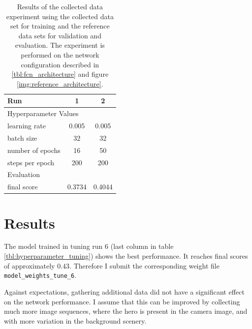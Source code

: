 \documentclass[11pt, onecolumn, oneside, reqno]{article}
\begin{document}
{{{{\renewcommand{\arraystretch}{2}%
\begin{table}
\centering
\begin{tabular}{|l|c|c|}
\hline 
Run & 1 & 2 \\
\hline  
\multicolumn{3}{l}{Hyperparameter Values}\\
\hline
learning rate    & 0.005 & 0.005 \\
batch size       & 32    & 32    \\
number of epochs & 16    & 50    \\
steps per epoch  & 200   & 200   \\
\hline 
\multicolumn{3}{l}{Evaluation}\\
\hline
final score & 0.3734 & 0.4044  \\
\hline 
\end{tabular}
\caption[Collected data experiment]{Results of the collected data experiment using the collected data set for training and the reference data sets for validation and evaluation. The experiment is performed on the network configuration described in \ref{tbl:fcn_architecture} and figure \ref{img:reference_architecture}.}
\label{tbl:collected_data_experiment}
\end{table}

\section{Results}
The model trained in tuning run $6$ (last column in table \ref{tbl:hyperparameter_tuning}) shows the best performance. It reaches final scores of approximately $0.43$. Therefore I submit the corresponding weight file \texttt{model\_weights\_tune\_6}.

Against expectations, gathering additional data did not have a significant effect on the network performance. I assume that this can be improved by collecting much more image sequences, where the hero is present in the camera image, and with more variation in the background scenery.

}}}}
\end{document}
